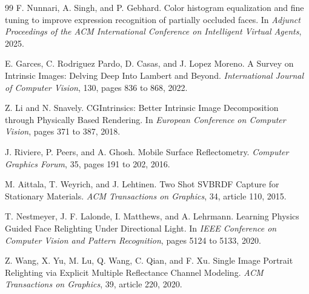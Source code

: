 \documentclass[12pt]{article}
\begin{document}
\begin{thebibliography}{99}
F. Nunnari, A. Singh, and P. Gebhard.
Color histogram equalization and fine tuning to improve expression recognition of partially occluded faces.
In \textit{Adjunct Proceedings of the ACM International Conference on Intelligent Virtual Agents}, 2025.

E. Garces, C. Rodriguez Pardo, D. Casas, and J. Lopez Moreno.
A Survey on Intrinsic Images: Delving Deep Into Lambert and Beyond.
\textit{International Journal of Computer Vision}, 130, pages 836 to 868, 2022.

Z. Li and N. Snavely.
CGIntrinsics: Better Intrinsic Image Decomposition through Physically Based Rendering.
In \textit{European Conference on Computer Vision}, pages 371 to 387, 2018.

J. Riviere, P. Peers, and A. Ghosh.
Mobile Surface Reflectometry.
\textit{Computer Graphics Forum}, 35, pages 191 to 202, 2016.

M. Aittala, T. Weyrich, and J. Lehtinen.
Two Shot SVBRDF Capture for Stationary Materials.
\textit{ACM Transactions on Graphics}, 34, article 110, 2015.

T. Nestmeyer, J. F. Lalonde, I. Matthews, and A. Lehrmann.
Learning Physics Guided Face Relighting Under Directional Light.
In \textit{IEEE Conference on Computer Vision and Pattern Recognition}, pages 5124 to 5133, 2020.

Z. Wang, X. Yu, M. Lu, Q. Wang, C. Qian, and F. Xu.
Single Image Portrait Relighting via Explicit Multiple Reflectance Channel Modeling.
\textit{ACM Transactions on Graphics}, 39, article 220, 2020.

\end{thebibliography}
\end{document}
